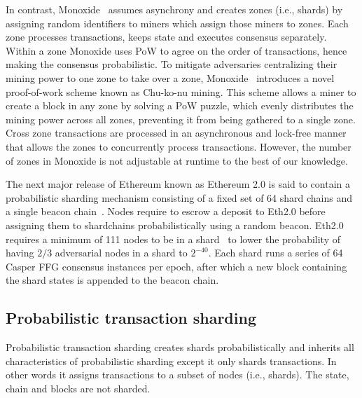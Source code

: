 \documentclass[11pt,dvipdfm]{article}
\newcommand{\vincent}[1]{\emph{Vincent: #1}}%
\newcommand{\deepal}[1]{\emph{Deepal: #1}}%
\begin{document}
In contrast, Monoxide~\cite{227661} assumes asynchrony and creates zones (i.e., shards) by assigning random identifiers to miners which assign those miners to zones. Each zone processes transactions, keeps state and executes consensus separately. Within a zone Monoxide uses PoW to agree on the order of transactions, hence making the consensus probabilistic. To mitigate adversaries centralizing their mining power to one zone to take over a zone, Monoxide~\cite{227661} introduces a novel proof-of-work scheme known as Chu-ko-nu mining. This scheme allows a miner to create a block in any zone by solving a PoW puzzle, which evenly distributes the mining power across all zones, preventing it from being gathered to a single zone. Cross zone transactions are processed in an asynchronous and lock-free manner that allows the zones to concurrently process transactions. However, the number of zones in Monoxide is not adjustable at runtime to the best of our knowledge.


The next major release of Ethereum known as Ethereum 2.0 is said to contain a probabilistic sharding mechanism consisting of a fixed set of 64 shard chains and a single beacon chain~\cite{Eth2}.
Nodes require to escrow a deposit to Eth2.0 before assigning them to shardchains probabilistically using a random beacon. Eth2.0 requires a minimum of 111 nodes to be in a shard~\cite{wels2019guaranteed} to lower the probability of having $2/3$ adversarial nodes in a shard to $2^{-40}$. 
Each shard runs a series of 64 Casper FFG consensus instances per epoch, after which a new block containing the shard states is appended to the beacon chain.

\subsection{Probabilistic transaction sharding}
Probabilistic transaction sharding creates shards probabilistically and inherits all characteristics of probabilistic sharding except it only shards transactions. In other words it assigns transactions to a subset of nodes (i.e., shards). The state, chain and blocks are not sharded.
\end{document}
